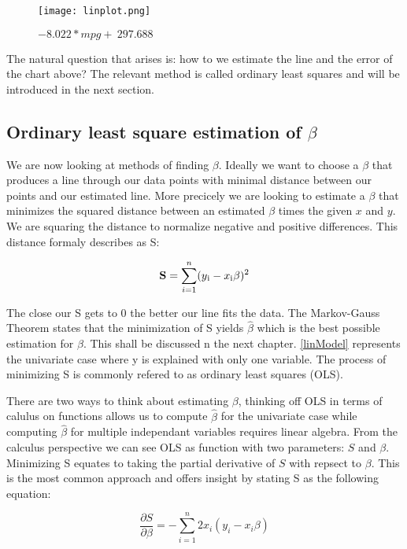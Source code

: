 \documentclass{article}
\begin{document}
    \begin{figure}[ht]
    \centering
        \texttt{[image: linplot.png]}
        \caption{$-8.022*mpg +\ 297.688$}
    \label{fig1}
    \end{figure}

    The natural question that arises is: how to we estimate the line and the error of the chart above? The relevant method is called ordinary least squares and will be introduced in the next section.

    \subsection{Ordinary least square estimation of $\beta$}

    We are now looking at methods of finding $\beta$. Ideally we want to choose a $\beta$ that produces a line through our data points with minimal distance between our points and our estimated line. More precicely we are looking to estimate a $\beta$ that minimizes the squared distance between an estimated $\beta$ times the given $x$ and $y$. We are squaring the distance to normalize negative and positive differences. This distance formaly describes as S:

    \begin{equation} \label{sumSquares} \mathbf{S} =  \sum_{i=1}^{n}(y\textsubscript{i} - x\textsubscript{i}\beta)^{2} \end{equation}

    The close our S gets to 0 the better our line fits the data. The  Markov-Gauss Theorem states that the minimization of S yields $\widehat{\beta}$ which is the best possible estimation for $\beta$. This shall be discussed n the next chapter. \ref{linModel} represents the univariate case where y is explained with only one variable. The process of minimizing S is commonly refered to as ordinary least squares (OLS).

    There are two ways to think about estimating $\beta$, thinking off OLS in terms of calulus on functions allows us to compute $\widehat{\beta}$ for the univariate case while computing $\widehat{\beta}$ for multiple independant variables requires linear algebra. From the calculus perspective we can see OLS as function with two parameters: $S$ and $\beta$. Minimizing S equates to taking the partial derivative of $S$ with repsect to $\beta$. This is the most common approach and offers insight by stating S as the following equation:

    \begin{equation} \label{partialDer} \frac{\partial S}{\partial \beta} = - \sum_{i=1}^{n} 2x_i(y_i-x_i\beta) \end{equation}
\end{document}
